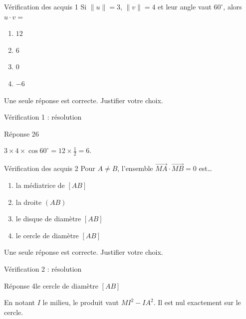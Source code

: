 \documentclass[aspectratio=169,12pt]{beamer}
\begin{document}
\renewcommand{\slidekind}{À VOUS DE JOUER}\begin{frame}[t]{Vérification des acquis 1}
Si $\|u\|=3$, $\|v\|=4$ et leur angle vaut $60^\circ$, alors $u\cdot v=$\begin{enumerate}
\item $12$
\item $6$
\item $0$
\item $-6$
\end{enumerate}\medskip Une seule réponse est correcte. Justifier votre choix.\end{frame}
\renewcommand{\slidekind}{COMPRENDRE LA RÉPONSE}\begin{frame}[t]{Vérification 1 : résolution}
\begin{block}{Réponse 2}$6$\end{block}\medskip $3\times4\times\cos60^\circ=12\times\frac12=6$.\end{frame}
\renewcommand{\slidekind}{À VOUS DE JOUER}\begin{frame}[t]{Vérification des acquis 2}
Pour $A\ne B$, l’ensemble $\overrightarrow{MA}\cdot\overrightarrow{MB}=0$ est…\begin{enumerate}
\item la médiatrice de $[AB]$
\item la droite $(AB)$
\item le disque de diamètre $[AB]$
\item le cercle de diamètre $[AB]$
\end{enumerate}\medskip Une seule réponse est correcte. Justifier votre choix.\end{frame}
\renewcommand{\slidekind}{COMPRENDRE LA RÉPONSE}\begin{frame}[t]{Vérification 2 : résolution}
\begin{block}{Réponse 4}le cercle de diamètre $[AB]$\end{block}\medskip En notant $I$ le milieu, le produit vaut $MI^2-IA^2$. Il est nul exactement sur le cercle.\end{frame}
\end{document}
